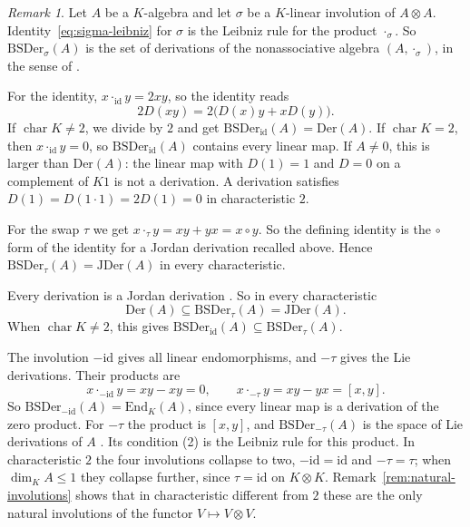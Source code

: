 \documentclass[]{interact}
\theoremstyle{plain}
\theoremstyle{definition}
\theoremstyle{remark}
\newtheorem{remark}[theorem]{Remark}
\newcommand{\Der}{\mathrm{Der}}
\newcommand{\JDer}{\mathrm{JDer}}
\newcommand{\BSDer}{\mathrm{BSDer}}
\begin{document}
\begin{remark}\label{rem:sigma-derivation-classification}
Let $A$ be a $K$-algebra and let $\sigma$ be a $K$-linear involution of $A \otimes A$.
Identity~\eqref{eq:sigma-leibniz} for $\sigma$ is the Leibniz rule for the product $\cdot_\sigma$.
So $\BSDer_\sigma(A)$ is the set of derivations of the nonassociative algebra $(A, \cdot_\sigma)$, in the sense of \citet[Part I]{Jacobson1937}.

For the identity, $x \cdot_{\mathrm{id}} y = 2xy$, so the identity reads
\[
2D(xy) = 2\bigl(D(x)y + xD(y)\bigr).
\]
If $\operatorname{char} K \neq 2$, we divide by $2$ and get $\BSDer_{\mathrm{id}}(A) = \Der(A)$.
If $\operatorname{char} K = 2$, then $x \cdot_{\mathrm{id}} y = 0$, so $\BSDer_{\mathrm{id}}(A)$ contains every linear map.
If $A \neq 0$, this is larger than $\Der(A)$: the linear map with $D(1) = 1$ and $D = 0$ on a complement of $K1$ is not a derivation. A derivation satisfies $D(1) = D(1 \cdot 1) = 2D(1) = 0$ in characteristic $2$.

For the swap $\tau$ we get $x \cdot_\tau y = xy + yx = x \circ y$.
So the defining identity is the $\circ$ form of the identity for a Jordan derivation recalled above.
Hence $\BSDer_\tau(A) = \JDer(A)$ in every characteristic.

Every derivation is a Jordan derivation \citep[p.~1003]{Bresar1988}.
So in every characteristic
\[
\Der(A) \subseteq \BSDer_\tau(A) = \JDer(A).
\]
When $\operatorname{char} K \neq 2$, this gives $\BSDer_{\mathrm{id}}(A) \subseteq \BSDer_\tau(A)$.

The involution $-\mathrm{id}$ gives all linear endomorphisms, and $-\tau$ gives the Lie derivations. Their products are
\[
x \cdot_{-\mathrm{id}} y = xy - xy = 0,
\qquad
x \cdot_{-\tau} y = xy - yx = [x, y].
\]
So $\BSDer_{-\mathrm{id}}(A) = \mathrm{End}_K(A)$, since every linear map is a derivation of the zero product.
For $-\tau$ the product is $[x,y]$, and $\BSDer_{-\tau}(A)$ is the space of Lie derivations of $A$ \citep[p.~183]{Martindale1964}.
Its condition (2) is the Leibniz rule for this product. %
In characteristic $2$ the four involutions collapse to two, $-\mathrm{id} = \mathrm{id}$ and $-\tau = \tau$; when $\dim_K A \le 1$ they collapse further, since $\tau = \mathrm{id}$ on $K \otimes K$.
Remark~\ref{rem:natural-involutions} shows that in characteristic different from $2$ these are the only natural involutions of the functor $V \mapsto V \otimes V$.

\end{remark}
\end{document}
